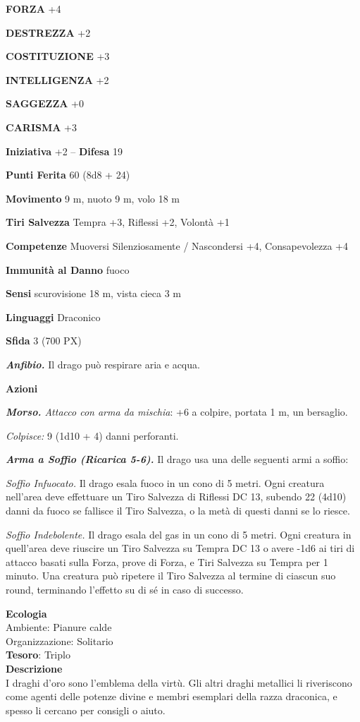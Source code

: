 \begin{multicols}{2}
\textbf{FORZA} +4

\textbf{DESTREZZA} +2

\textbf{COSTITUZIONE} +3

\textbf{INTELLIGENZA} +2

\textbf{SAGGEZZA} +0

\textbf{CARISMA} +3

\textbf{Iniziativa} +2 -- \textbf{Difesa} 19

\textbf{Punti Ferita} 60 (8d8 + 24)

\textbf{Movimento} 9 m, nuoto 9 m, volo 18 m

\textbf{Tiri Salvezza} Tempra +3, Riflessi +2, Volontà +1

\textbf{Competenze} Muoversi Silenziosamente / Nascondersi +4, Consapevolezza +4

\textbf{Immunità al Danno} fuoco

\textbf{Sensi} scurovisione 18 m, vista cieca 3 m

\textbf{Linguaggi} Draconico

\textbf{Sfida} 3 (700 PX)

\textit{\textbf{Anfibio.}} Il drago può respirare aria e acqua.

\textbf{Azioni}

\textit{\textbf{Morso.} Attacco con arma da mischia}: +6 a colpire, portata 1 m, un bersaglio.

\textit{Colpisce:} 9 (1d10 + 4) danni perforanti.

\textit{\textbf{Arma a Soffio (Ricarica 5-6).}} Il drago usa una delle seguenti armi a soffio:

\textit{Soffio Infuocato.} Il drago esala fuoco in un cono di 5 metri. Ogni creatura nell'area deve effettuare un Tiro Salvezza di Riflessi DC 13, subendo 22 (4d10) danni da fuoco se fallisce il Tiro Salvezza, o la metà di questi danni se lo riesce.

\textit{Soffio Indebolente.} Il drago esala del gas in un cono di 5 metri. Ogni creatura in quell'area deve riuscire un Tiro Salvezza su Tempra DC 13 o avere -1d6 ai tiri di attacco basati sulla Forza, prove di Forza, e Tiri Salvezza su Tempra per 1 minuto. Una creatura può ripetere il Tiro Salvezza al termine di ciascun suo round, terminando l'effetto su di sé in caso di successo.

\textbf{Ecologia}\\
Ambiente: Pianure calde\\
Organizzazione: Solitario\\
\textbf{Tesoro}: Triplo\\
\textbf{Descrizione}\\
I draghi d'oro sono l'emblema della virtù. Gli altri draghi metallici li riveriscono come agenti delle potenze divine e membri esemplari della razza draconica, e spesso li cercano per consigli o aiuto.


\end{multicols}
